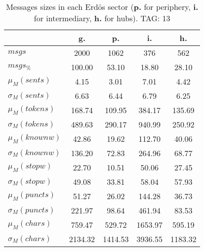 \begin{table}[h!]
\begin{center}
\begin{tabular}{| l | c | c | c | c |}\hline
 & g. & p. & i. & h. \\\hline
$msgs$ & 2000  & 1062  & 376  & 562 \\\hline
$msgs_{\%}$ & 100.00  & 53.10  & 18.80  & 28.10 \\\hline
$\mu_M(sents)$ & 4.15  & 3.01  & 7.01  & 4.42 \\\hline
$\sigma_M(sents)$ & 6.63  & 6.44  & 6.79  & 6.25 \\\hline
$\mu_M(tokens)$ & 168.74  & 109.95  & 384.17  & 135.69 \\\hline
$\sigma_M(tokens)$ & 489.63  & 290.17  & 940.99  & 250.92 \\\hline
$\mu_M(knownw)$ & 42.86  & 19.62  & 112.70  & 40.06 \\\hline
$\sigma_M(knownw)$ & 136.20  & 72.83  & 264.96  & 68.77 \\\hline
$\mu_M(stopw)$ & 22.70  & 10.51  & 50.06  & 27.45 \\\hline
$\sigma_M(stopw)$ & 49.08  & 33.81  & 58.04  & 57.93 \\\hline
$\mu_M(puncts)$ & 51.27  & 26.02  & 144.28  & 36.73 \\\hline
$\sigma_M(puncts)$ & 221.97  & 98.64  & 461.94  & 83.53 \\\hline
$\mu_M(chars)$ & 759.47  & 529.72  & 1653.97  & 595.19 \\\hline
$\sigma_M(chars)$ & 2134.32  & 1414.53  & 3936.55  & 1183.32 \\\hline
\end{tabular}
\caption{Messages sizes in each Erd\"os sector ({{\bf p.}} for periphery, {{\bf i.}} for intermediary, {{\bf h.}} for hubs). TAG: 13}
\end{center}
\end{table}